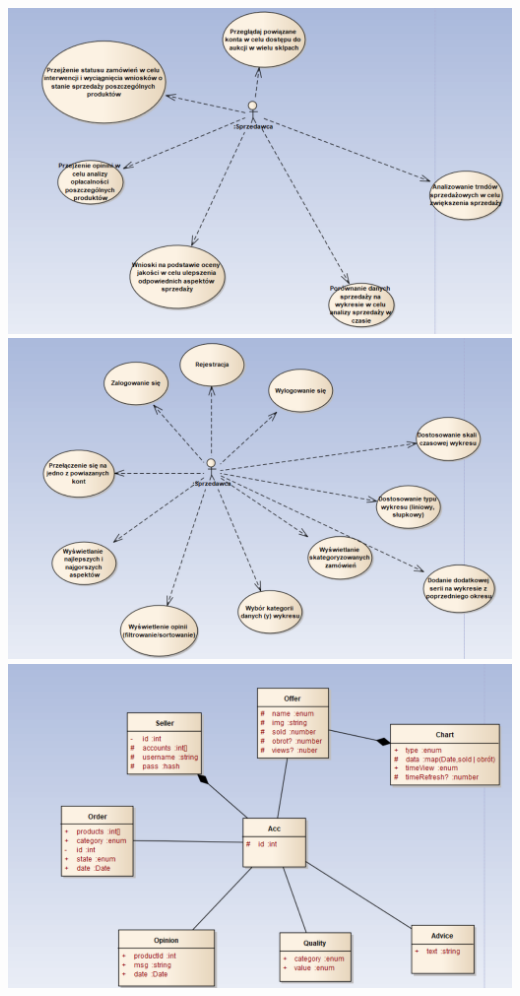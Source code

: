 \documentclass[a4paper,11pt]{article}
\begin{document}
\includegraphics[scale=0.5]{src2/src2/c1.png}\\
\includegraphics[scale=0.5]{src2/src2/c2.png}\\
\includegraphics[scale=0.5]{src2/src2/c3.png}\\
\end{document}
